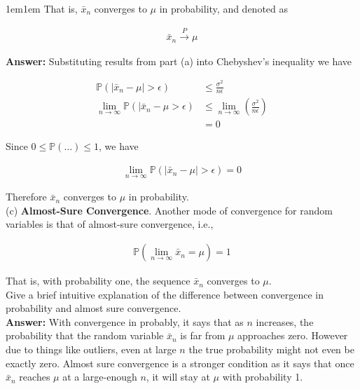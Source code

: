 \documentclass[11pt]{article}
\begin{document}
\begin{adjustwidth}{1em}{1em}
    That is, $\bar{x}_n$ converges to $\mu$ in probability, and denoted as 

    \begin{align*}
        \bar{x}_n \xrightarrow{P} \mu
    \end{align*}

    \textbf{Answer:} Substituting results from part (a) into Chebyshev's inequality we have 

    \begin{align*}
        \mathbb{P}(|\bar{x}_n - \mu| > \epsilon) &\leq \frac{\sigma^2}{n \epsilon} \\
        \lim_{n\to\infty}\mathbb{P}(|\bar{x}_n - \mu > \epsilon) &\leq \lim_{n\to\infty}\left(
        \frac{\sigma^2}{n\epsilon}\right) \\ 
                                                                 &= 0
    \end{align*}

    Since $0 \leq \mathbb{P}(\dots) \leq 1$, we have 

    \begin{align*}
        \lim_{n\to\infty}\mathbb{P}(|\bar{x}_n - \mu| > \epsilon) = 0
    \end{align*}

    Therefore $\bar{x}_n$ converges to $\mu$ in probability. \\ 

    (c) \textbf{Almost-Sure Convergence}. Another mode of convergence for random variables is that
    of almost-sure convergence, i.e.,
    
    \begin{align*}
        \mathbb{P}\left(\lim_{n\to\infty}\bar{x}_n = \mu\right) = 1
    \end{align*}

    That is, with probability one, the sequence $\bar{x}_n$ converges to $\mu$. \\ 

    Give a brief intuitive explanation of the difference between convergence in probability 
    and almost sure convergence. \\ 

    \textbf{Answer:} With convergence in probably, it says that as $n$ increases, the probability
    that the random variable $\bar{x}_n$ is far from $\mu$ approaches zero. However due to things
    like outliers, even at large $n$ the true probability might not even be exactly zero. Almost
    sure convergence is a stronger condition as it says that once $\bar{x}_n$ reaches $\mu$ at a 
    large-enough $n$, it will stay at $\mu$ with probability 1. \\

    \end{adjustwidth}
\end{document}
